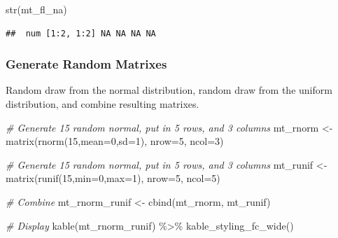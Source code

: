 \documentclass[
]{book}
\newenvironment{Shaded}{\begin{snugshade}}{\end{snugshade}}
\newcommand{\AttributeTok}[1]{\textcolor[rgb]{0.77,0.63,0.00}{#1}}
\newcommand{\CommentTok}[1]{\textcolor[rgb]{0.56,0.35,0.01}{\textit{#1}}}
\newcommand{\DecValTok}[1]{\textcolor[rgb]{0.00,0.00,0.81}{#1}}
\newcommand{\FunctionTok}[1]{\textcolor[rgb]{0.00,0.00,0.00}{#1}}
\newcommand{\NormalTok}[1]{#1}
\newcommand{\OtherTok}[1]{\textcolor[rgb]{0.56,0.35,0.01}{#1}}
\newcommand{\SpecialCharTok}[1]{\textcolor[rgb]{0.00,0.00,0.00}{#1}}
\begin{document}
\begin{Shaded}
\begin{Highlighting}[]
\FunctionTok{str}\NormalTok{(mt\_fl\_na)}
\end{Highlighting}
\end{Shaded}

\begin{verbatim}
##  num [1:2, 1:2] NA NA NA NA
\end{verbatim}

\hypertarget{generate-random-matrixes}{%
\subsubsection{Generate Random Matrixes}\label{generate-random-matrixes}}

Random draw from the normal distribution, random draw from the uniform distribution, and combine resulting matrixes.

\begin{Shaded}
\begin{Highlighting}[]
\CommentTok{\# Generate 15 random normal, put in 5 rows, and 3 columns}
\NormalTok{mt\_rnorm }\OtherTok{\textless{}{-}} \FunctionTok{matrix}\NormalTok{(}\FunctionTok{rnorm}\NormalTok{(}\DecValTok{15}\NormalTok{,}\AttributeTok{mean=}\DecValTok{0}\NormalTok{,}\AttributeTok{sd=}\DecValTok{1}\NormalTok{), }\AttributeTok{nrow=}\DecValTok{5}\NormalTok{, }\AttributeTok{ncol=}\DecValTok{3}\NormalTok{)}

\CommentTok{\# Generate 15 random normal, put in 5 rows, and 3 columns}
\NormalTok{mt\_runif }\OtherTok{\textless{}{-}} \FunctionTok{matrix}\NormalTok{(}\FunctionTok{runif}\NormalTok{(}\DecValTok{15}\NormalTok{,}\AttributeTok{min=}\DecValTok{0}\NormalTok{,}\AttributeTok{max=}\DecValTok{1}\NormalTok{), }\AttributeTok{nrow=}\DecValTok{5}\NormalTok{, }\AttributeTok{ncol=}\DecValTok{5}\NormalTok{)}

\CommentTok{\# Combine}
\NormalTok{mt\_rnorm\_runif }\OtherTok{\textless{}{-}} \FunctionTok{cbind}\NormalTok{(mt\_rnorm, mt\_runif)}

\CommentTok{\# Display}
\FunctionTok{kable}\NormalTok{(mt\_rnorm\_runif) }\SpecialCharTok{\%\textgreater{}\%}
  \FunctionTok{kable\_styling\_fc\_wide}\NormalTok{()}
\end{Highlighting}
\end{Shaded}
\end{document}
